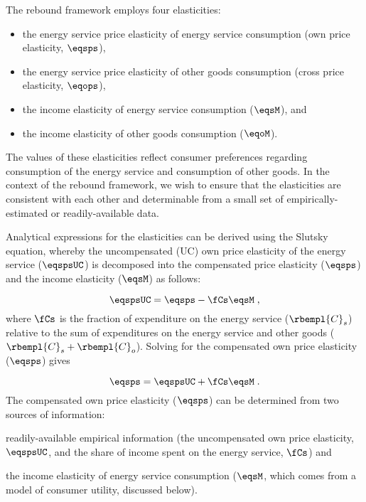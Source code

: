

The rebound framework employs four elasticities:
%
\begin{itemize}

  \item the energy service price elasticity of energy service consumption (own price elasticity, $\eqsps$),

  \item the energy service price elasticity of other goods consumption (cross price elasticity, $\eqops$), 
  
  \item the income elasticity of energy service consumption ($\eqsM$), and 
  
  \item the income elasticity of other goods consumption ($\eqoM$).

\end{itemize}
%
The values of these elasticities reflect consumer preferences regarding 
consumption of the energy service and consumption of other goods.
In the context of the rebound framework, 
we wish to ensure that the elasticities are consistent with each other
and determinable from a small set 
of empirically-estimated or readily-available data. 

Analytical expressions for the elasticities can be derived using the Slutsky equation, 
whereby the uncompensated (UC) own price elasticity 
of the energy service ($\eqspsUC$) 
is decomposed into the compensated price elasticity ($\eqsps$) and
the income elasticity ($\eqsM$) as follows:

\begin{equation} \label{eq:slutsky}
  \eqspsUC = \eqsps - \fCs \eqsM \; ,
\end{equation}
%
where $\fCs$ is the fraction of expenditure
on the energy service ($\rbempl{C}_s$)
relative to the sum of expenditures on the energy service and other goods
($\rbempl{C}_s + \rbempl{C}_o$). 
Solving for the compensated own price elasticity ($\eqsps$) gives

\begin{equation} \label{eq:eqsps}
  \eqsps = \eqspsUC + \fCs \eqsM \; .
\end{equation}
%
The compensated own price elasticity ($\eqsps$)
can be determined from two sources of information:
%
\begin{enumerate*}[label={(\alph*)}]
	
  \item readily-available empirical information
        (the uncompensated own price elasticity, $\eqspsUC$, and 
        the share of income spent on the energy service, $\fCs$)
        and 
  
  \item the income elasticity of energy service consumption 
        ($\eqsM$, which comes from a model of consumer utility, discussed below).
    
\end{enumerate*}


